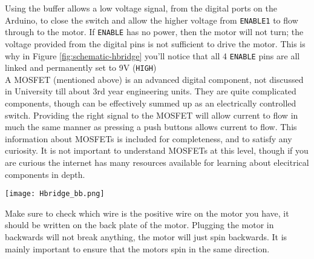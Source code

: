 \documentclass[../TinyBot.tex]{subfiles}
\begin{document}
Using the buffer allows a low voltage signal, from the digital ports on the Arduino, to close the switch and allow the higher voltage from \lstinline[]!ENABLE1! to flow through to the motor. If \lstinline[]!ENABLE! has no power, then the motor will not turn; the voltage provided from the digital pins is not sufficient to drive the motor.  This is why in Figure \ref{fig:schematic-hbridge} you'll notice that all 4 \lstinline[]!ENABLE! pins are all linked and permanently set to 9V (\lstinline[]!HIGH!) \\


A MOSFET (mentioned above) is an advanced digital component, not discussed in University till about 3rd year engineering units. They are quite complicated components, though can be effectively summed up as an electrically controlled switch. Providing the right signal to the MOSFET will allow current to flow in much the same manner as pressing a push buttons allows current to flow. This information about MOSFETs is included for completeness, and to satisfy any curiosity. It is not important to understand MOSFETs at this level, though if you are curious the internet has many resources available for learning about elecitrical components in depth. \\

\begin{center}
    \texttt{[image: Hbridge\_bb.png]}
    \label{fig:schematic-hbridge}
\end{center}

Make sure to check which wire is the positive wire on the motor you have, it should be written on the back plate of the motor. Plugging the motor in backwards will not break anything, the motor will just spin backwards. 
It is mainly important to ensure that the motors spin in the same direction. 
\end{document}
